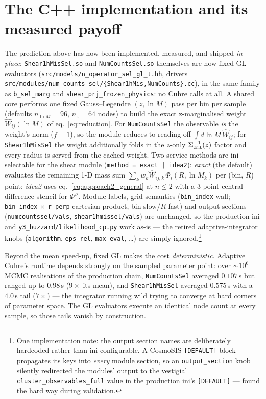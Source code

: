 \documentclass[a4paper, 11pt]{article}
\newcommand{\lnM}{\ln M}
\newcommand{\pyfile}[1]{{\small\texttt{#1}}}
\begin{document}
\section{The C++ implementation and its measured payoff}
\label{sec:cpp_impl}

The prediction above has now been implemented, measured, and shipped
\emph{in place}: \texttt{Shear1hMisSel.so} and \texttt{NumCountsSel.so}
themselves are now fixed-GL evaluators
(\pyfile{src/models/n\_operator\_sel\_gl\_t.hh}, drivers
\pyfile{src/modules/num\_counts\_sel/\{Shear1hMis,NumCounts\}.cc}), in
the same family as \texttt{b\_sel\_marg} and
\texttt{shear\_prj\_frozen\_physics}: no Cuhre calls at all. A shared
core performs one fixed Gauss--Legendre $(z,\lnM)$ pass per bin per
sample (defaults $n_{\lnM}=96$, $n_z=64$ nodes) to build the exact
z-marginalised weight $\widehat W_{ij}(\lnM)$ of
eq.~\eqref{eq:reduction}. For \texttt{NumCountsSel} the observable
\emph{is} the weight's norm ($f=1$), so the module reduces to reading
off $\int d\lnM\,\widehat W_{ij}$; for \texttt{Shear1hMisSel} the
weight additionally folds in the $z$-only
$\Sigma_{\rm crit}^{-1}(z)$ factor and every radius is served from the
cached weight. Two service methods are ini-selectable for the shear
module (\texttt{method = exact | idea2}): \emph{exact} (the default)
evaluates the remaining 1-D mass sum
$\sum_k w_k \widehat W_{ij,k}\,\Phi_i(R,\lnM_k)$ per (bin, $R$) point;
\emph{idea2} uses eq.~\eqref{eq:approach2_general} at $n\le2$ with a
3-point central-difference stencil for $\Phi''$. Module labels, grid
semantics (\texttt{bin\_index} wall; \texttt{bin\_index} $\times$
\texttt{r\_perp} cartesian product, bin-slow/$R$-fast) and output
sections (\texttt{numcountssel/vals}, \texttt{shear1hmissel/vals}) are
unchanged, so the production ini and
\pyfile{y3\_buzzard/likelihood\_cp.py} work as-is --- the retired
adaptive-integrator knobs (\texttt{algorithm}, \texttt{eps\_rel},
\texttt{max\_eval}, \dots) are simply ignored.\footnote{One
implementation note: the output section names are deliberately
hardcoded rather than ini-configurable. A CosmoSIS \texttt{[DEFAULT]}
block propagates its keys into \emph{every} module section, so an
\texttt{output\_section} knob silently redirected the modules' output
to the vestigial \texttt{cluster\_observables\_full} value in the
production ini's \texttt{[DEFAULT]} --- found the hard way during
validation.}

Beyond the mean speed-up, fixed GL makes the cost
\emph{deterministic}. Adaptive Cuhre's runtime depends strongly on the
sampled parameter point: over $\sim10^6$ MCMC realisations of the
production chain, \texttt{NumCountsSel} averaged $0.107$\,s but
ranged up to $0.98$\,s ($9\times$ its mean), and
\texttt{Shear1hMisSel} averaged $0.575$\,s with a $4.0$\,s tail
($7\times$) --- the integrator running wild trying to converge at hard
corners of parameter space. The GL evaluators execute an identical
node count at every sample, so those tails vanish by construction.
\end{document}
